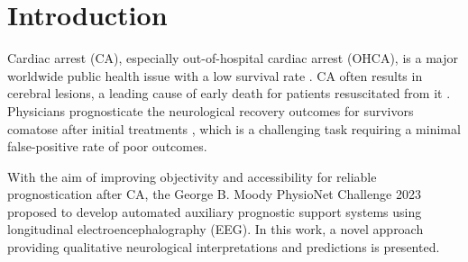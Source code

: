 \section{Introduction}
\label{sec:intro}


Cardiac arrest (CA), especially out-of-hospital cardiac arrest (OHCA), is a major worldwide public health issue with a low survival rate \cite{Yan_2020_Global}. CA often results in cerebral lesions, a leading cause of early death for patients resuscitated from it \cite{Benghanem_2022_Prog}. Physicians prognosticate the neurological recovery outcomes for survivors comatose after initial treatments \cite{Cronberg_2020_Brain}, which is a challenging task requiring a minimal false-positive rate of poor outcomes.

With the aim of improving objectivity and accessibility for reliable prognostication after CA, the George B. Moody PhysioNet Challenge 2023 \cite{Goldberger2000, 2023Challenge} proposed to develop automated auxiliary prognostic support systems using longitudinal electroencephalography (EEG). In this work, a novel approach providing qualitative neurological interpretations and predictions is presented.

